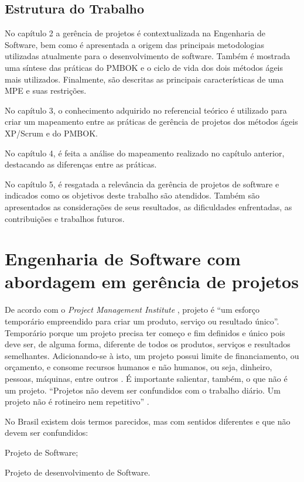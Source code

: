 \documentclass[
    12pt,               %
    openright,          %
    twoside,            %
    a4paper,            %
    chapter=TITLE,     %
    english,            %
    spanish,            %
    portuguese              %
    ]{abntex2}
\newcommand\dblquote[1]{\textquotedblleft #1\textquotedblright}
\begin{document}
\section{Estrutura do Trabalho}
No capítulo 2 a gerência de projetos  é contextualizada na Engenharia de Software, bem como é apresentada a origem das principais metodologias utilizadas atualmente para o desenvolvimento de software. Também é mostrada uma síntese das práticas do PMBOK e o ciclo de vida dos dois métodos ágeis mais utilizados. Finalmente, são descritas as principais características de uma MPE e suas restrições.

No capítulo 3, o conhecimento adquirido no referencial teórico é utilizado para criar um mapeamento entre as práticas de gerência de projetos dos métodos ágeis XP/Scrum e do PMBOK.

No capítulo 4, é feita a análise do mapeamento realizado no capítulo anterior, destacando as diferenças entre as práticas.

No capítulo 5, é resgatada a relevância da gerência de projetos de software e indicados como os objetivos deste trabalho são atendidos. Também são apresentados as considerações de seus resultados, as dificuldades enfrentadas, as contribuições e trabalhos futuros.

\chapter{Engenharia de Software com abordagem em gerência de projetos}

De acordo com o \textit{Project Management Institute} \cite{pmi2013}, projeto é \dblquote{um esforço temporário empreendido para criar um produto, serviço ou resultado único}. Temporário porque um projeto precisa ter começo e fim definidos e único pois deve ser, de alguma forma, diferente de todos os produtos, serviços e resultados semelhantes. Adicionando-se à isto, um projeto possui limite de financiamento, ou orçamento, e consome recursos humanos e não humanos, ou seja, dinheiro, pessoas, máquinas, entre outros \cite[p.~2]{kerzner2011}. É importante salientar, também, o que não é um projeto. \dblquote{Projetos não devem ser confundidos com o trabalho diário. Um projeto não é rotineiro nem repetitivo} \cite[p.~6]{grayLarson2009}.

No Brasil existem dois termos parecidos, mas com sentidos diferentes e que não devem ser confundidos:

\begin{alineas}
	\item Projeto de Software;
	\item Projeto de desenvolvimento de Software.
\end{alineas}
\end{document}
